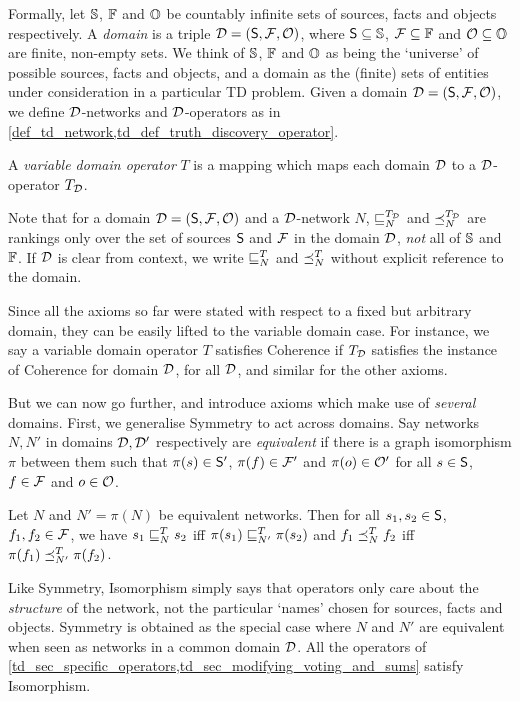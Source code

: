 Formally, let $\uS$, $\uF$ and $\uO$ be countably infinite sets of sources,
facts and objects respectively. A \emph{domain} is a triple $\D = (\S, \F,
\O)$, where $\S \subseteq \uS$, $\F \subseteq \uF$ and $\O \subseteq \uO$ are
finite, non-empty sets. We think of $\uS$, $\uF$ and $\uO$ as being the
`universe' of possible sources, facts and objects, and a domain as the (finite)
sets of entities under consideration in a particular TD problem. Given a domain
$\D = (\S, \F, \O)$, we define $\D$-networks and $\D$-operators as in
\cref{def_td_network,td_def_truth_discovery_operator}.

\begin{definition}
    A \emph{variable domain operator} $T$ is a mapping which maps each domain
    $\D$ to a $\D$-operator $T_\D$.
\end{definition}

Note that for a domain $\D = (\S, \F, \O)$ and a $\D$-network $N$,
$\sle_N^{T_\D}$ and $\fle_N^{T_\D}$ are rankings only over the set of sources
$\S$ and $\F$ in the domain $\D$, \emph{not} all of $\uS$ and $\uF$. If $\D$ is
clear from context, we write $\sle_N^T$ and $\fle_N^T$ without explicit
reference to the domain.

Since all the axioms so far were stated with respect to a fixed but arbitrary
domain, they can be easily lifted to the variable domain case. For instance, we
say a variable domain operator $T$ satisfies Coherence if $T_\D$ satisfies the
instance of Coherence for domain $\D$, for all $\D$, and similar for the other
axioms.

But we can now go further, and introduce axioms which make use of
\emph{several} domains. First, we generalise Symmetry to act across domains.
Say networks $N, N'$ in domains $\D, \D'$ respectively are \emph{equivalent} if
there is a graph isomorphism $\pi$ between them such that $\pi(s) \in \S'$,
$\pi(f) \in \F'$ and $\pi(o) \in \O'$ for all $s \in \S$, $f \in \F$ and $o \in
\O$.

\begin{axiom}[Isomorphism]
    Let $N$ and $N' = \pi(N)$ be equivalent networks. Then for all $s_1, s_2
    \in \S$, $f_1, f_2 \in \F$, we have $s_1 \sle_N^T s_2$ iff $\pi(s_1)
    \sle_{N'}^T \pi(s_2)$ and $f_1 \fle_N^T f_2$ iff $\pi(f_1) \fle_{N'}^T
    \pi(f_2)$.
\end{axiom}

Like Symmetry, Isomorphism simply says that operators only care about the
\emph{structure} of the network, not the particular `names' chosen for sources,
facts and objects. Symmetry is obtained as the special case where $N$ and $N'$
are equivalent when seen as networks in a common domain $\D$. All the operators
of \cref{td_sec_specific_operators,td_sec_modifying_voting_and_sums} satisfy
Isomorphism.

